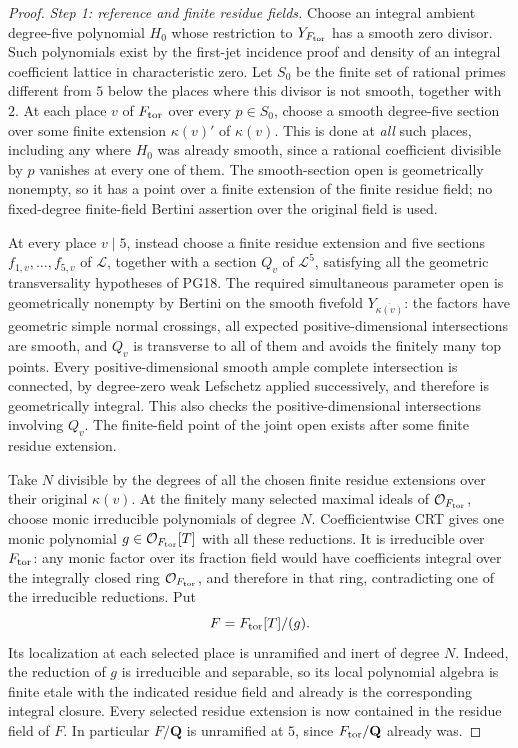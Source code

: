 \begin{proof}
\emph{Step 1: reference and finite residue fields.}
Choose an integral ambient degree-five polynomial
\(H_0\) whose restriction to \(Y_{F_{\rm tor}}\)
has a smooth zero divisor.  Such polynomials exist
by the first-jet incidence proof and density of
an integral coefficient lattice in characteristic
zero.  Let \(S_0\) be the finite set of rational
primes different from \(5\) below the places where
this divisor is not smooth, together with \(2\).
At each place \(v\) of \(F_{\rm tor}\) over every
\(p\in S_0\), choose a smooth degree-five section
over some finite extension \(\kappa(v)'\) of
\(\kappa(v)\).  This is done at \emph{all} such
places, including any where \(H_0\) was already
smooth, since a rational coefficient divisible
by \(p\) vanishes at every one of them.
The smooth-section open is geometrically nonempty,
so it has a point over a finite extension of the
finite residue field; no fixed-degree finite-field
Bertini assertion over the original field is used.

At every place \(v\mid5\), instead choose a finite
residue extension and five sections \(f_{1,v},\ldots,
f_{5,v}\) of \(\mathcal L\), together with a
section \(Q_v\) of \(\mathcal L^5\), satisfying all
the geometric transversality hypotheses of PG18.
The required simultaneous parameter open is
geometrically nonempty by Bertini on the smooth
fivefold \(Y_{\overline{\kappa(v)}}\): the factors
have geometric simple normal crossings, all
expected positive-dimensional intersections are
smooth, and \(Q_v\) is transverse to all of them
and avoids the finitely many top points.
Every positive-dimensional smooth ample complete
intersection is connected, by degree-zero weak
Lefschetz applied successively, and therefore is
geometrically integral.  This also checks the
positive-dimensional intersections involving
\(Q_v\).  The finite-field point of the joint open
exists after some finite residue extension.

Take \(N\) divisible by the degrees of all the
chosen finite residue extensions over their
original \(\kappa(v)\).  At the finitely many
selected maximal ideals of \(\mathcal O_{F_{\rm tor}}\),
choose monic irreducible polynomials of degree \(N\).
Coefficientwise CRT gives one monic polynomial
\(g\in\mathcal O_{F_{\rm tor}}[T]\) with all these
reductions.  It is irreducible over \(F_{\rm tor}\):
any monic factor over its fraction field would
have coefficients integral over the integrally
closed ring \(\mathcal O_{F_{\rm tor}}\), and
therefore in that ring, contradicting one of
the irreducible reductions.  Put
\[
                 F=F_{\rm tor}[T]/(g).
\]
Its localization at each selected place is
unramified and inert of degree \(N\).
Indeed, the reduction of \(g\) is irreducible
and separable, so its local polynomial algebra
is finite etale with the indicated residue
field and already is the corresponding
integral closure.  Every selected residue
extension is now contained in the residue
field of \(F\).  In particular \(F/\mathbf Q\)
is unramified at \(5\), since \(F_{\rm tor}/
\mathbf Q\) already was.


\end{proof}
